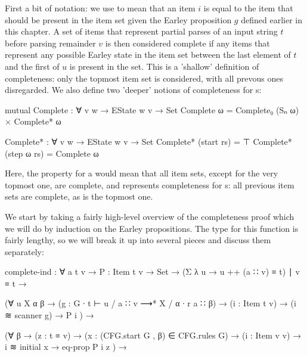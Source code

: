 		First a bit of notation: we use  to mean that an item $i$
		is equal to the item that should be present in the item set given the
		Earley proposition $g$ defined earlier in this chapter. A set of items
		that represent partial parses of an input string $t$ before parsing
		remainder $v$ is then considered complete if any items that represent
		any possible Earley state in the item set between the last element of
		$t$ and the first of $u$ is present in the set. This is a 'shallow'
		definition of completeness: only the topmost item set is considered,
		with all prevous ones disregarded. We also define two 'deeper' notions of
		completeness for s:

		\begin{code}
			  mutual
			    Complete : ∀ {v w} → EState w v → Set
			    Complete ω = Complete₀ (Sₙ ω) × Complete* ω
			  
			    Complete* : ∀ {v w} → EState w v → Set
			    Complete* (start rs) = ⊤
			    Complete* (step ω rs) = Complete ω
		\end{code}

		Here, the  property for a  would mean
		that all item sets, except for the very topmost one, are complete, and
		 represents completeness for s: all
		previous item sets are complete, as is the topmost one.

		We start by taking a fairly high-level overview of the completeness
		proof which we will do by induction on the Earley propositions. The
		type for this function is fairly lengthy, so we will break it up into
		several pieces and discuss them separately:

		\begin{code}
			  complete-ind : ∀ {a t v} →
			    {P : Item t v → Set} →
			    (Σ λ u → u ++ (a ∷ v) ≡ t) ∣ v ≡ t →
			
			    (∀ {u X α β} →
			      (g : G ∙ t ⊢ u / a ∷ v ⟶* X / α ∙ r a ∷ β) →
			      (i : Item t v) → (i ≋ scanner g) →
			      P i
			    ) →
			
			    (∀ {β} →
			      (z : t ≡ v) →
			      (x : (CFG.start G , β) ∈ CFG.rules G) →
			      (i : Item v v) →
			      i ≋ initial x → eq-prop P i z
			    ) →
		\end{code}

